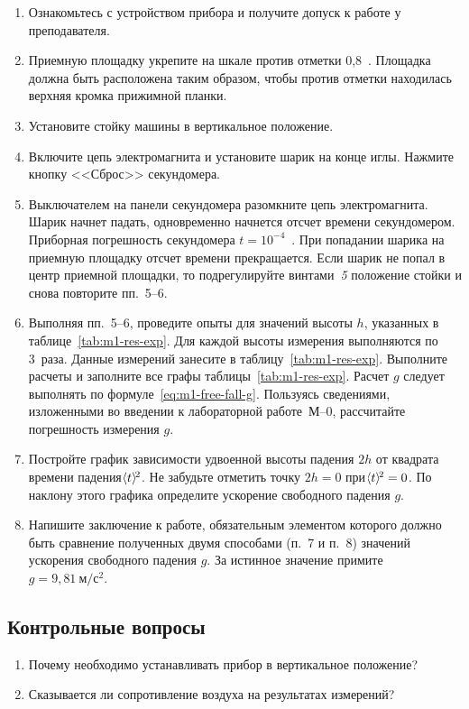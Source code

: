 \documentclass[a4paper, 12pt]{extarticle}
\begin{document}
\begin{enumerate}
\item Ознакомьтесь с устройством прибора и получите допуск к работе у преподавателя.
\item Приемную площадку укрепите на шкале против отметки 0,8~. Площадка должна быть расположена таким образом, чтобы против отметки находилась верхняя кромка прижимной планки.
\item Установите стойку машины в вертикальное положение.
\item Включите цепь электромагнита и установите шарик на конце иглы. Нажмите кнопку <<Сброс>> секундомера.
\item Выключателем на панели секундомера разомкните цепь электромагнита. Шарик начнет падать, одновременно начнется отсчет времени секундомером. Приборная погрешность секундомера $t = 10^{-4}$~. При попадании шарика на приемную площадку отсчет времени прекращается. Если шарик не попал в центр приемной площадки, то подрегулируйте винтами~\emph{5} положение стойки и снова повторите пп.~5--6. %
\item Выполняя пп.~5--6, проведите опыты для значений высоты $h$, указанных в таблице~\ref{tab:m1-res-exp}. Для каждой высоты измерения выполняются по 3~раза. Данные измерений занесите в таблицу~\ref{tab:m1-res-exp}. Выполните расчеты и заполните все графы таблицы~\ref{tab:m1-res-exp}. Расчет $g$ следует выполнять по формуле~\eqref{eq:m1-free-fall-g}. Пользуясь сведениями, изложенными во введении к лабораторной работе~М--0, рассчитайте погрешность измерения $g$. %
\item Постройте график зависимости удвоенной высоты падения $2h$ от квадрата времени падения $\hspace{-3pt}\left<t\right>\hspace{-3pt}^2$. Не забудьте отметить точку $2h = 0$ при $\hspace{-3pt}\left<t\right>\hspace{-3pt}^2 = 0$. По наклону этого графика определите ускорение свободного падения $g$.
\item Напишите заключение к работе, обязательным элементом которого должно быть сравнение полученных двумя способами (п.~7 и п.~8) значений ускорения свободного падения $g$. За истинное значение примите $g = 9,81\   \text{м}/\text{с}^2$. %
\end{enumerate}

\subsection{Контрольные вопросы}
\begin{enumerate}
\item Почему необходимо устанавливать прибор в вертикальное положение? %
\item Сказывается ли сопротивление воздуха на результатах измерений?
\end{enumerate}
\end{document}
